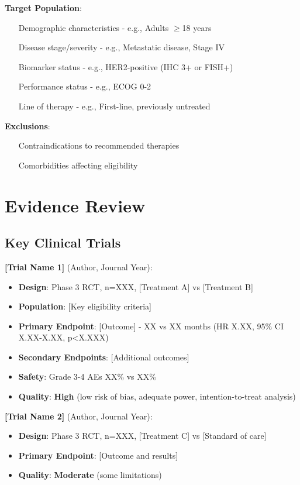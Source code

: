 \documentclass[10pt,letterpaper]{article}
\begin{document}
\textbf{Target Population}:
\begin{itemize}
\item [Demographic characteristics - e.g., Adults $\geq$18 years]
\item [Disease stage/severity - e.g., Metastatic disease, Stage IV]
\item [Biomarker status - e.g., HER2-positive (IHC 3+ or FISH+)]
\item [Performance status - e.g., ECOG 0-2]
\item [Line of therapy - e.g., First-line, previously untreated]
\end{itemize}

\textbf{Exclusions}:
\begin{itemize}
\item [Contraindications to recommended therapies]
\item [Comorbidities affecting eligibility]
\end{itemize}

\section{Evidence Review}

\subsection{Key Clinical Trials}

\textbf{[Trial Name 1]} (Author, Journal Year):
\begin{itemize}
\item \textbf{Design}: Phase 3 RCT, n=XXX, [Treatment A] vs [Treatment B]
\item \textbf{Population}: [Key eligibility criteria]
\item \textbf{Primary Endpoint}: [Outcome] - XX vs XX months (HR X.XX, 95\% CI X.XX-X.XX, p<X.XXX)
\item \textbf{Secondary Endpoints}: [Additional outcomes]
\item \textbf{Safety}: Grade 3-4 AEs XX\% vs XX\%
\item \textbf{Quality}: \textbf{High} (low risk of bias, adequate power, intention-to-treat analysis)
\end{itemize}

\textbf{[Trial Name 2]} (Author, Journal Year):
\begin{itemize}
\item \textbf{Design}: Phase 3 RCT, n=XXX, [Treatment C] vs [Standard of care]
\item \textbf{Primary Endpoint}: [Outcome and results]
\item \textbf{Quality}: \textbf{Moderate} (some limitations)
\end{itemize}
\end{document}
